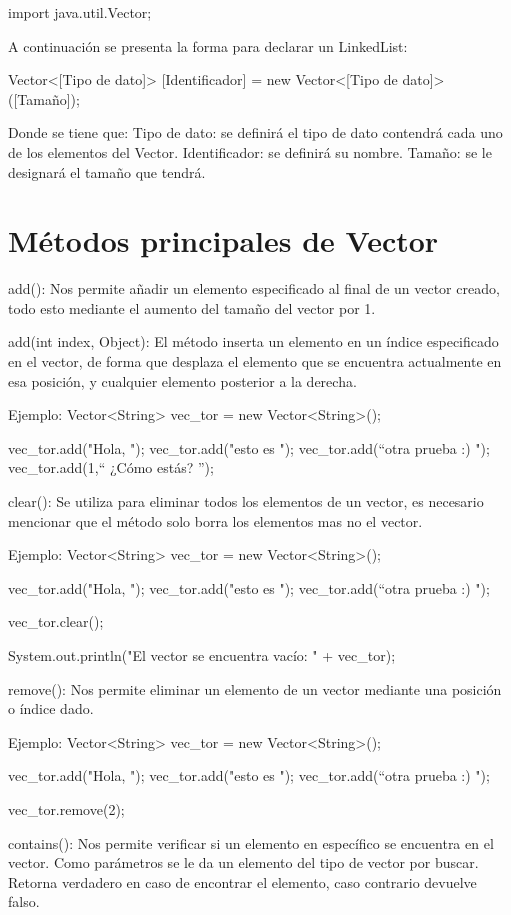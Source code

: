\documentclass[12pt, letterpaper]{article} %
\begin{document}
import java.util.Vector;

A continuación se presenta la forma para declarar un LinkedList:

Vector<[Tipo de dato]> [Identificador] = new Vector<[Tipo de dato]>([Tamaño]);

Donde se tiene que:
Tipo de dato: se definirá el tipo de dato contendrá cada uno de los elementos del Vector.
Identificador: se definirá su nombre.
Tamaño: se le designará el tamaño que tendrá.

\section*{Métodos principales de Vector}
add():
Nos permite añadir un elemento especificado al final de un vector creado, todo esto mediante el aumento del tamaño del vector por 1.

add(int index, Object):
El método inserta un elemento en un índice especificado en el vector, de forma que desplaza el elemento que se encuentra actualmente en esa posición, y cualquier elemento posterior a la derecha.

Ejemplo:
Vector<String> vec_tor = new Vector<String>();

vec_tor.add("Hola, ");
vec_tor.add("esto es ");
vec_tor.add(“otra prueba :) ");
vec_tor.add(1,“ ¿Cómo estás? ”);


clear():
Se utiliza para eliminar todos los elementos de un vector, es necesario mencionar que el método solo borra los elementos mas no el vector.

Ejemplo:
Vector<String> vec_tor = new Vector<String>();

vec_tor.add("Hola, ");
vec_tor.add("esto es ");
vec_tor.add(“otra prueba :) ");

vec_tor.clear();

System.out.println("El vector se encuentra vacío: " + vec_tor);

remove():
Nos permite eliminar un elemento de un vector mediante una posición o índice dado.

Ejemplo:
Vector<String> vec_tor = new Vector<String>();

vec_tor.add("Hola, ");
vec_tor.add("esto es ");
vec_tor.add(“otra prueba :) ");

vec_tor.remove(2);


contains():
Nos permite verificar si un elemento en específico se encuentra en el vector. Como parámetros se le da un elemento del tipo de vector por buscar. Retorna verdadero en caso de encontrar el elemento, caso contrario devuelve falso.
\end{document}
